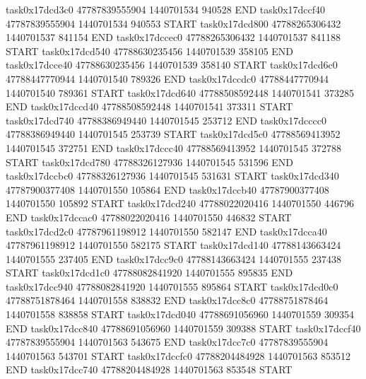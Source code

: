 task0x17dcd3c0 47787839555904          1440701534               940528  END
task0x17dccf40 47787839555904          1440701534               940553  START
task0x17dcd800 47788265306432          1440701537               841154  END
task0x17dccec0 47788265306432          1440701537               841188  START
task0x17dcd540 47788630235456          1440701539               358105  END
task0x17dcce40 47788630235456          1440701539               358140  START
task0x17dcd6c0 47788447770944          1440701540               789326  END
task0x17dccdc0 47788447770944          1440701540               789361  START
task0x17dcd640 47788508592448          1440701541               373285  END
task0x17dccd40 47788508592448          1440701541               373311  START
task0x17dcd740 47788386949440          1440701545               253712  END
task0x17dcccc0 47788386949440          1440701545               253739  START
task0x17dcd5c0 47788569413952          1440701545               372751  END
task0x17dccc40 47788569413952          1440701545               372788  START
task0x17dcd780 47788326127936          1440701545               531596  END
task0x17dccbc0 47788326127936          1440701545               531631  START
task0x17dcd340 47787900377408          1440701550               105864  END
task0x17dccb40 47787900377408          1440701550               105892  START
task0x17dcd240 47788022020416          1440701550               446796  END
task0x17dccac0 47788022020416          1440701550               446832  START
task0x17dcd2c0 47787961198912          1440701550               582147  END
task0x17dcca40 47787961198912          1440701550               582175  START
task0x17dcd140 47788143663424          1440701555               237405  END
task0x17dcc9c0 47788143663424          1440701555               237438  START
task0x17dcd1c0 47788082841920          1440701555               895835  END
task0x17dcc940 47788082841920          1440701555               895864  START
task0x17dcd0c0 47788751878464          1440701558               838832  END
task0x17dcc8c0 47788751878464          1440701558               838858  START
task0x17dcd040 47788691056960          1440701559               309354  END
task0x17dcc840 47788691056960          1440701559               309388  START
task0x17dccf40 47787839555904          1440701563               543675  END
task0x17dcc7c0 47787839555904          1440701563               543701  START
task0x17dccfc0 47788204484928          1440701563               853512  END
task0x17dcc740 47788204484928          1440701563               853548  START
